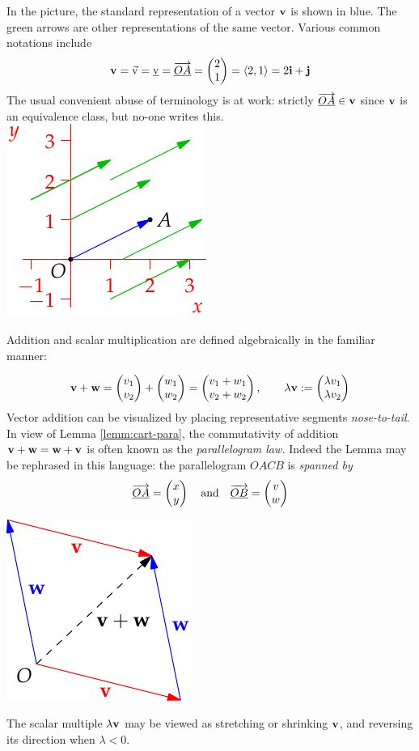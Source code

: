 \begin{example}[lower separated=false, sidebyside, sidebyside align=top seam, sidebyside gap=0pt, righthand width=0.3\linewidth]{}{}
In the picture, the standard representation of a vector ${\mathbf{v}}$ is shown in blue. The green arrows are other representations of the same vector. Various common notations include
\[{\mathbf{v}}=\vec{\mathrm{v}}=\underline{\mathrm{v}}=\overrightarrow{\underline{OA}}=\begin{pmatrix}2\\1\end{pmatrix}=\left\langle 2,1\right\rangle=2{\mathbf{i}}+{\mathbf{j}}\]
The usual convenient abuse of terminology is at work: strictly $\overrightarrow{\underline{OA}}\in{\mathbf{v}}$ since ${\mathbf{v}}$ is an equivalence class, but no-one writes this.
\tcblower
\flushright\includegraphics{analytic-defn}
\end{example}

Addition and scalar multiplication are defined algebraically in the familiar manner:\par
\begin{minipage}[t]{0.74\linewidth}\vspace{-5pt}
\[{\mathbf{v}}+{\mathbf{w}}=\begin{pmatrix}v_1\\v_2\end{pmatrix}+\begin{pmatrix}w_1\\w_2\end{pmatrix}=\begin{pmatrix}v_1+w_1\\v_2+w_2\end{pmatrix},\qquad \lambda{\mathbf{v}}:=\begin{pmatrix}\lambda v_1\\\lambda v_2\end{pmatrix}\]
Vector addition can be visualized by placing representative segments \emph{nose-to-tail}. In view of Lemma \ref{lemm:cart-para}, the commutativity of addition ${\mathbf{v}}+{\mathbf{w}}={\mathbf{w}}+{\mathbf{v}}$ is often known as the \emph{parallelogram law.} Indeed the Lemma may be rephrased in this language: the parallelogram $OACB$ is \emph{spanned by}
\[\overrightarrow{\underline{OA}}=\begin{pmatrix}x\\y\end{pmatrix}\quad\text{and}\quad\overrightarrow{\underline{OB}}=\begin{pmatrix}v\\w\end{pmatrix}\]
\end{minipage}
\begin{minipage}[t]{0.25\linewidth}\vspace{0pt}
\flushright\includegraphics{analytic-para2}
\end{minipage}\medbreak
The scalar multiple $\lambda{\mathbf{v}}$ may be viewed as stretching or shrinking ${\mathbf{v}}$, and reversing its direction when $\lambda<0$.


